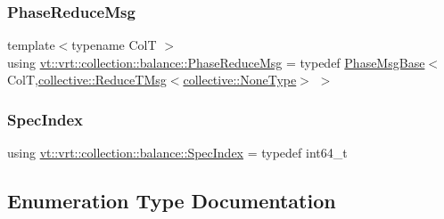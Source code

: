 \mbox{\label{namespacevt_1_1vrt_1_1collection_1_1balance_a04cf83e524629461fafc8d349af8ac8a}} 
\subsubsection{\texorpdfstring{Phase\+Reduce\+Msg}{PhaseReduceMsg}}
{\footnotesize\ttfamily template$<$typename ColT $>$ \\
using \hyperlink{namespacevt_1_1vrt_1_1collection_1_1balance_a04cf83e524629461fafc8d349af8ac8a}{vt\+::vrt\+::collection\+::balance\+::\+Phase\+Reduce\+Msg} = typedef \hyperlink{structvt_1_1vrt_1_1collection_1_1balance_1_1_phase_msg_base}{Phase\+Msg\+Base}$<$ ColT,\hyperlink{namespacevt_1_1collective_a28b82d5d48c9bc6e4fd738fcbf9e0f62}{collective\+::\+Reduce\+T\+Msg}$<$\hyperlink{namespacevt_1_1collective_af988b64711231f96d33ebfaf891e52a4}{collective\+::\+None\+Type}$>$ $>$}

\mbox{\label{namespacevt_1_1vrt_1_1collection_1_1balance_a72a5e0d9936ddf57f8e6c64e0e9fd123}} 
\subsubsection{\texorpdfstring{Spec\+Index}{SpecIndex}}
{\footnotesize\ttfamily using \hyperlink{namespacevt_1_1vrt_1_1collection_1_1balance_a72a5e0d9936ddf57f8e6c64e0e9fd123}{vt\+::vrt\+::collection\+::balance\+::\+Spec\+Index} = typedef int64\+\_\+t}



\subsection{Enumeration Type Documentation}
\mbox{\label{namespacevt_1_1vrt_1_1collection_1_1balance_a9cc6c6884ca0416dae824e9204093c57}} 
